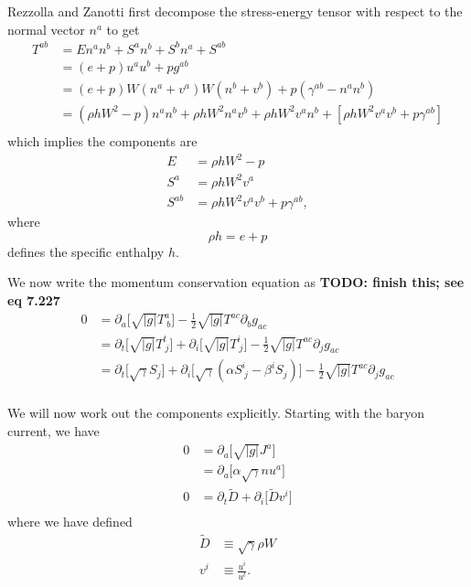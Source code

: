 \documentclass[12pt]{article}
\numberwithin{equation}{section}
\begin{document}
Rezzolla and Zanotti \cite{RezzollaZanotti} first decompose the stress-energy tensor with respect to the normal vector $n^a$ to get
\begin{equation}
\begin{aligned}
T^{ab} &= E n^a n^b + S^a n^b + S^b n^a + S^{ab} \\
&= (e+p) u^a u^b + p g^{ab} \\
&= (e+p) W (n^a + v^a) W (n^b + v^b) + p (\gamma^{ab} - n^a n^b) \\
&= (\rho h W^2 - p) n^a n^b + \rho h W^2 n^a v^b + \rho h W^2 v^a n^b + [\rho h W^2 v^a v^b + p \gamma^{ab}] \\
\end{aligned}
\end{equation}
which implies the components are
\begin{equation}
\begin{aligned}
E &= \rho h W^2 - p \\
S^{a} &= \rho h W^2 v^a \\
S^{ab} &= \rho h W^2 v^a v^b + p \gamma^{ab},
\end{aligned}
\end{equation}
where
\begin{equation}
\rho h = e + p
\end{equation}
defines the specific enthalpy $h$.

We now write the momentum conservation equation as \textbf{TODO: finish this; see \cite{RezzollaZanotti} eq 7.227}
\begin{equation}
\begin{aligned}
0 &= \partial_a \big[ \sqrt{|g|} T^{a}_{~b} \big] - \frac{1}{2} \sqrt{|g|} T^{ac} \partial_{b} g_{ac} \\
&= \partial_t \big[ \sqrt{|g|} T^{t}_{~j} \big] + \partial_i \big[ \sqrt{|g|} T^{i}_{~j} \big] - \frac{1}{2} \sqrt{|g|} T^{ac} \partial_{j} g_{ac} \\
&= \partial_t \big[ \sqrt{\gamma} S_j \big] + \partial_i \big[ \sqrt{\gamma} (\alpha S^{i}_{~j} - \beta^{i} S_j) \big] - \frac{1}{2} \sqrt{|g|} T^{ac} \partial_{j} g_{ac} \\
\end{aligned}
\end{equation}

\clearpage

We will now work out the components explicitly.
Starting with the baryon current, we have
\begin{equation}
\begin{aligned}
0 &= \partial_a \big[ \sqrt{|g|} J^{a} \big] \\
&= \partial_a \big[ \alpha \sqrt{\gamma} n u^a \big] \\
0 &= \partial_t \tilde{D} + \partial_i \big[ \tilde{D} v^i \big] \\
\end{aligned}
\end{equation}
where we have defined
\begin{equation}
\begin{aligned}
\tilde{D} &\equiv \sqrt{\gamma} \rho W \\
v^{i} &\equiv \frac{u^i}{u^t}.
\end{aligned}
\end{equation}
\end{document}
